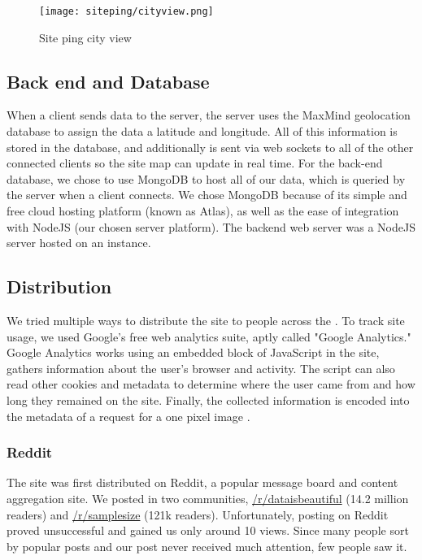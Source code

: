 \begin{figure}[h]
    \centering
    \texttt{[image: siteping/cityview.png]}
    \caption{Site ping city view}
    \label{fig:siteping_city}
\end{figure}

\subsection{Back end and Database}

When a client sends data to the server, the server uses the MaxMind geolocation database to assign the data a latitude and longitude. All of this information is stored in the database, and additionally is sent via web sockets to all of the other connected clients so the site map can update in real time. For the back-end database, we chose to use MongoDB to host all of our data, which is queried by the server when a client connects. We chose MongoDB because of its simple and free cloud hosting platform (known as Atlas), as well as the ease of integration with NodeJS (our chosen server platform). The backend web server was a NodeJS server hosted on an \aws \ecc instance.

\subsection{Distribution}

We tried multiple ways to distribute the site to people across the \us. To track site usage, we used Google's free web analytics suite, aptly called "Google Analytics." Google Analytics works using an embedded block of JavaScript in the site, gathers information about the user's browser and activity. The script can also read other cookies and metadata to determine where the user came from and how long they remained on the site. Finally, the collected information is encoded into the metadata of a request for a one pixel image \cite{GoogleGoogleOverview}.

\subsubsection{Reddit}

The site was first distributed on Reddit, a popular message board and content aggregation site. We posted in two communities, \href{https://reddit.com/r/dataisbeautiful}{/r/dataisbeautiful} (14.2 million readers) and \href{https://reddit.com/r/samplesize}{/r/samplesize} (121k readers). Unfortunately, posting on Reddit proved unsuccessful and gained us only around 10 views. Since many people sort by popular posts and our post never received much attention, few people saw it.

